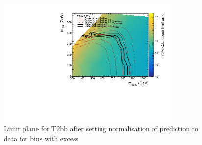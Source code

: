 \begin{figure}[tbhp]
  \caption{Limit plane for T2bb after setting normalisation of prediction to data for bins with excess \label{fig:removeExcessByHand_T2bb}} 
  \begin{center}    
    \includegraphics[width=0.8\textwidth]{figures/susyResults/finalCanvasObsLimitXs_excessRemovedByHand_T2bb}
  \end{center}
\end{figure}
